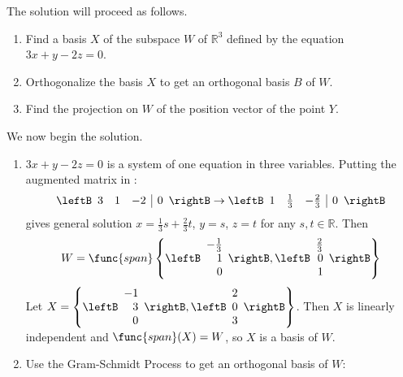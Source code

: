 \begin{solution}
The solution will proceed as follows.
\begin{enumerate}
\item Find a basis $X$ of the subspace $W$ of $\mathbb{R}^3$ defined by
the equation  $3x+y-2z=0$.
\item Orthogonalize the basis $X$ to get an orthogonal basis
$B$ of $W$.
\item Find the projection on $W$ of the position vector of
the point $Y$.
\end{enumerate}

We now begin the solution.
\begin{enumerate}
\item $3x+y-2z=0$ is a system of one equation in three variables.
Putting the augmented matrix in {\rref}:
\[
\leftB\begin{array}{rrr|r} 3 & 1 & -2 & 0 \end{array}\rightB
\rightarrow
\leftB\begin{array}{rrr|r} 1 & \frac{1}{3} & -\frac{2}{3} & 0 \end{array}\rightB
\]
gives general solution $x=\frac{1}{3}s+\frac{2}{3}t$, $y=s$, $z=t$
for any $s,t\in\mathbb{R}$.
Then  
\[
W=\func{span} \left\{
\leftB\begin{array}{r} -\frac{1}{3} \\ 1 \\ 0 \end{array}\rightB,
\leftB\begin{array}{r} \frac{2}{3} \\ 0 \\ 1 \end{array}\rightB\right\}
\]
Let
$X=\left\{
\leftB\begin{array}{r} -1 \\ 3 \\ 0 \end{array}\rightB,
\leftB\begin{array}{r} 2 \\ 0 \\ 3 \end{array}\rightB\right\}$.
Then $X$ is linearly independent and $\func{span}(X)=W$, so $X$ is a basis of $W$.

\item Use the Gram-Schmidt Process to get an
orthogonal basis of $W$: 



\end{enumerate}
\end{solution}
